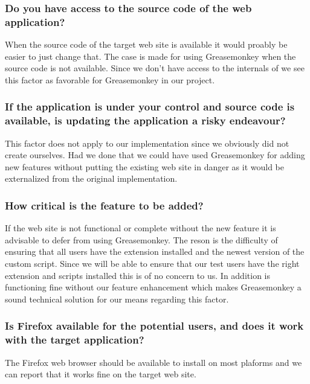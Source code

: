 \subsubsection{Do you have access to the source code of the web application?}

When the source code of the target web site is available it would proably
be easier to just change that. The case is made for using Greasemonkey when
the source code is not available. Since we don't have access to the internals
of \urort{} we see this factor as favorable for Greasemonkey in our project.

\subsubsection{If the application is under your control and source code is
  available, is updating the application a risky endeavour?}

This factor does not apply to our implementation since we obviously did not
create \urort{} ourselves. Had we done that we could have used
Greasemonkey for adding new features without putting the existing web
site in danger as it would be externalized from the original implementation.

\subsubsection{How critical is the feature to be added?}

If the web site is not functional or complete without the new feature
it is advisable to defer from using Greasemonkey. The reson is the
difficulty of ensuring that all users have the extension installed
and the newest version of the custom script. Since we will be able
to ensure that our test users have the right extension and scripts
installed this is of no concern to us. In addition \urort{} is
functioning fine without our feature enhancement which makes
Greasemonkey a sound technical solution for our means regarding this factor.


\subsubsection{Is Firefox available for the potential users, and does it
  work with the target application?}

The Firefox web browser should be available to install on most plaforms
and we can report that it works fine on the target web site.

